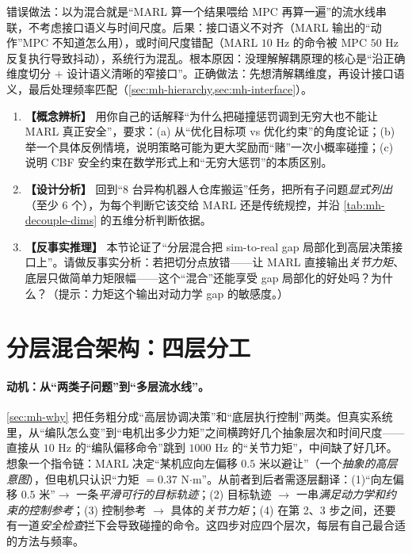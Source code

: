 \begin{pitfall}
错误做法：以为混合就是“MARL 算一个结果喂给 MPC 再算一遍”的流水线串联，不考虑接口语义与时间尺度。后果：接口语义不对齐（MARL 输出的“动作”MPC 不知道怎么用），或时间尺度错配（MARL $10$ Hz 的命令被 MPC $50$ Hz 反复执行导致抖动），系统行为混乱。根本原因：没理解解耦原理的核心是“沿正确维度切分 $+$ 设计语义清晰的窄接口”。正确做法：先想清解耦维度，再设计接口语义，最后处理频率匹配（\cref{sec:mh-hierarchy,sec:mh-interface}）。
\end{pitfall}

\begin{practice}
\begin{enumerate}
  \item \textbf{【概念辨析】} 用你自己的话解释“为什么把碰撞惩罚调到无穷大也不能让 MARL 真正安全”，要求：(a) 从“优化目标项 vs 优化约束”的角度论证；(b) 举一个具体反例情境，说明策略可能为更大奖励而“赌”一次小概率碰撞；(c) 说明 CBF 安全约束在数学形式上和“无穷大惩罚”的本质区别。
  \item \textbf{【设计分析】} 回到“$8$ 台异构机器人仓库搬运”任务，把所有子问题\emph{显式列出}（至少 $6$ 个），为每个判断它该交给 MARL 还是传统规控，并沿 \cref{tab:mh-decouple-dims} 的五维分析判断依据。
  \item \textbf{【反事实推理】} 本节论证了“分层混合把 sim-to-real gap 局部化到高层决策接口上”。请做反事实分析：若把切分点放错——让 MARL 直接输出\emph{关节力矩}、底层只做简单力矩限幅——这个“混合”还能享受 gap 局部化的好处吗？为什么？（提示：力矩这个输出对动力学 gap 的敏感度。）
\end{enumerate}
\end{practice}

\section{分层混合架构：四层分工}
\label{sec:mh-hierarchy}

\paragraph{动机：从“两类子问题”到“多层流水线”。}
\cref{sec:mh-why} 把任务粗分成“高层协调决策”和“底层执行控制”两类。但真实系统里，从“编队怎么变”到“电机出多少力矩”之间横跨好几个抽象层次和时间尺度——直接从 $10$ Hz 的“编队偏移命令”跳到 $1000$ Hz 的“关节力矩”，中间缺了好几环。想象一个指令链：MARL 决定“某机应向左偏移 $0.5$ 米以避让”（一个\emph{抽象的高层意图}），但电机只认识“力矩 $=0.37$ N$\cdot$m”。从前者到后者需逐层翻译：(1)“向左偏移 $0.5$ 米”$\to$ 一条\emph{平滑可行的目标轨迹}；(2) 目标轨迹 $\to$ 一串\emph{满足动力学和约束的控制参考}；(3) 控制参考 $\to$ 具体的\emph{关节力矩}；(4) 在第 2、3 步之间，还要有一道\emph{安全检查}拦下会导致碰撞的命令。这四步对应四个层次，每层有自己最合适的方法与频率。

